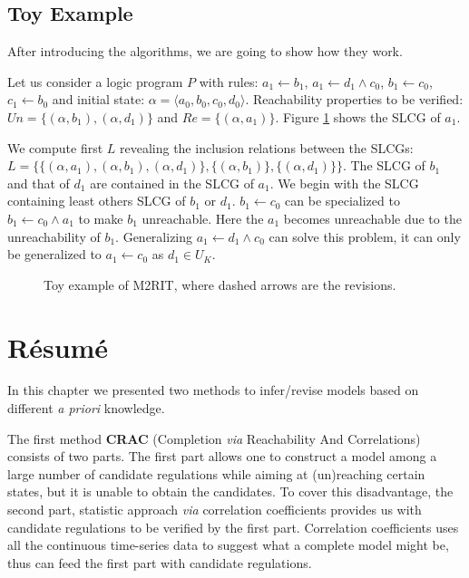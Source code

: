     
\subsection{Toy Example}    
After introducing the algorithms, we are going to show how they work.

\begin{example}
Let us consider a logic program $P$ with rules: $a_1\gets b_1$, $a_1\gets d_1 \land c_0$, $b_1\gets c_0$, $c_1\gets b_0$ and initial state: $\alpha=\langle a_0,b_0,c_0,d_0\rangle$.
Reachability properties to be verified: $Un=\{(\alpha,b_1),(\alpha,d_1)\}$ and $Re=\{(\alpha,a_1)\}$.
Figure \ref{fig:toyExampleM2RIT} shows the SLCG of $a_1$.

We compute first $L$ revealing the inclusion relations between the SLCGs: $L=\{\{(\alpha,a_1),(\alpha,b_1),(\alpha,d_1)\},\{(\alpha,b_1)\},\{(\alpha,d_1)\}\}$.
The SLCG of $b_1$ and that of $d_1$ are contained in the SLCG of $a_1$.
We begin with the SLCG containing least others SLCG of $b_1$ or $d_1$.
$b_1\gets c_0$ can be specialized to $b_1\gets c_0\land a_1$ to make $b_1$ unreachable.
Here the $a_1$ becomes unreachable due to the unreachability of $b_1$.
Generalizing $a_1\gets d_1 \land c_0$ can solve this problem, it can only be generalized to $a_1 \gets c_0$ as $d_1\in U_K$.
\end{example}
    \begin{figure}[ht]
        \centering
        
        \caption{Toy example of M2RIT, where dashed arrows are the revisions.}
        \label{fig:toyExampleM2RIT}
    \end{figure}
\section{R\'esum\'e}
In this chapter we presented two methods to infer/revise models based on different \textit{a priori} knowledge.

The first method \textbf{CRAC} (Completion \textit{via} Reachability And Correlations) consists of two parts.
The first part allows one to construct a model among a large number of candidate regulations while aiming at (un)reaching certain states, but it is unable to obtain the candidates.
To cover this disadvantage, the second part, statistic approach \textit{via} correlation coefficients provides us with candidate regulations to be verified by the first part.
Correlation coefficients uses all the continuous time-series data to suggest what a complete model might be, thus can feed the first part with candidate regulations.


